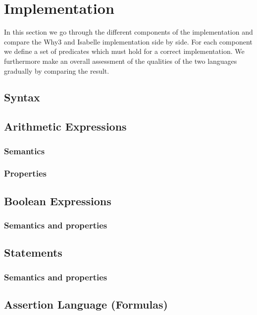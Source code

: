 \section{Implementation}
In this section we go through the different components of the implementation and compare the Why3 and Isabelle
implementation side by side.
For each component we define a set of predicates which must hold for a correct implementation.
We furthermore make an overall assessment of the qualities of the two languages gradually by comparing the result.

\subsection{Syntax}


\subsection{Arithmetic Expressions}

\subsubsection{Semantics}


\subsubsection{Properties}


\subsection{Boolean Expressions}

\subsubsection{Semantics and properties}


\subsection{Statements}
\subsubsection{Semantics and properties}



\subsection{Assertion Language (Formulas)}\label{sec:iformulas}


